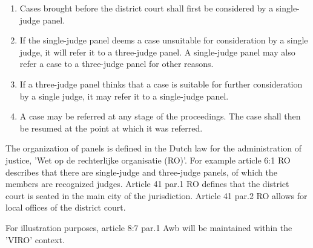 \documentclass[10pt,a4paper]{report}              %
\theoremstyle{plain}\theorembodyfont{\rmfamily}\newtheorem{definition}{Definition}[section]
\theoremstyle{plain}\theorembodyfont{\rmfamily}\newtheorem{designrule}[definition]{Requirement}
\begin{document}
\begin{enumerate}[1.]
\item
  Cases brought before the district court shall first be considered by a
  single-judge panel.
\item
  If the single-judge panel deems a case unsuitable for consideration by
  a single judge, it will refer it to a three-judge panel. A
  single-judge panel may also refer a case to a three-judge panel for
  other reasons.
\item
  If a three-judge panel thinks that a case is suitable for further
  consideration by a single judge, it may refer it to a single-judge
  panel.
\item
  A case may be referred at any stage of the proceedings. The case shall
  then be resumed at the point at which it was referred.
\end{enumerate}
The organization of panels is defined in the Dutch law for the
administration of justice, 'Wet op de rechterlijke organisatie (RO)'.
For example article 6:1 RO describes that there are single-judge and
three-judge panels, of which the members are recognized judges. Article
41 par.1 RO defines that the district court is seated in the main city
of the jurisdiction. Article 41 par.2 RO allows for local offices of the
district court.

For illustration purposes, article 8:7 par.1 Awb will be maintained
within the 'VIRO' context.
\end{document}
